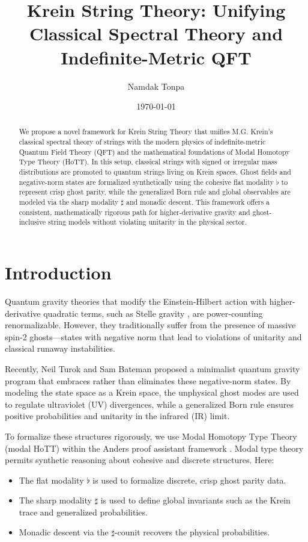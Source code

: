 \documentclass{article}
\title{Krein String Theory: Unifying Classical Spectral Theory and Indefinite-Metric QFT}
\author{Namdak Tonpa}
\date{\today}
\begin{document}
\maketitle

\begin{abstract}
We propose a novel framework for Krein String Theory that unifies M.G. Krein's classical spectral theory of strings with the modern physics of indefinite-metric Quantum Field Theory (QFT) and the mathematical foundations of Modal Homotopy Type Theory (HoTT). In this setup, classical strings with signed or irregular mass distributions are promoted to quantum strings living on Krein spaces. Ghost fields and negative-norm states are formalized synthetically using the cohesive flat modality $\flat$ to represent crisp ghost parity, while the generalized Born rule and global observables are modeled via the sharp modality $\sharp$ and monadic descent. This framework offers a consistent, mathematically rigorous path for higher-derivative gravity and ghost-inclusive string models without violating unitarity in the physical sector.
\end{abstract}

\newpage

\ifincludeTOC
  \tableofcontents
\fi

\newpage

\section{Introduction}
\label{sec:intro}

Quantum gravity theories that modify the Einstein-Hilbert action with higher-derivative quadratic terms, such as Stelle gravity \cite{stelle}, are power-counting renormalizable. However, they traditionally suffer from the presence of massive spin-2 ghosts—states with negative norm that lead to violations of unitarity and classical runaway instabilities. 

Recently, Neil Turok and Sam Bateman \cite{turok} proposed a minimalist quantum gravity program that embraces rather than eliminates these negative-norm states. By modeling the state space as a Krein space, the unphysical ghost modes are used to regulate ultraviolet (UV) divergences, while a generalized Born rule ensures positive probabilities and unitarity in the infrared (IR) limit.

To formalize these structures rigorously, we use Modal Homotopy Type Theory (modal HoTT) within the Anders proof assistant framework \cite{anders}. Modal type theory permits synthetic reasoning about cohesive and discrete structures. Here:
\begin{itemize}
    \item The flat modality $\flat$ is used to formalize discrete, crisp ghost parity data.
    \item The sharp modality $\sharp$ is used to define global invariants such as the Krein trace and generalized probabilities.
    \item Monadic descent via the $\sharp$-counit recovers the physical probabilities.
\end{itemize}
\end{document}

